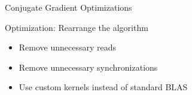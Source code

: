 


\begin{frame}[fragile]{Conjugate Gradient Optimizations}

 \begin{block}{Optimization: Rearrange the algorithm}
   \begin{itemize}
   \item  Remove unnecessary reads 
   \item  Remove unnecessary synchronizations
   \item Use custom kernels instead of standard BLAS
  \end{itemize}
 \end{block}
   
\end{frame}


